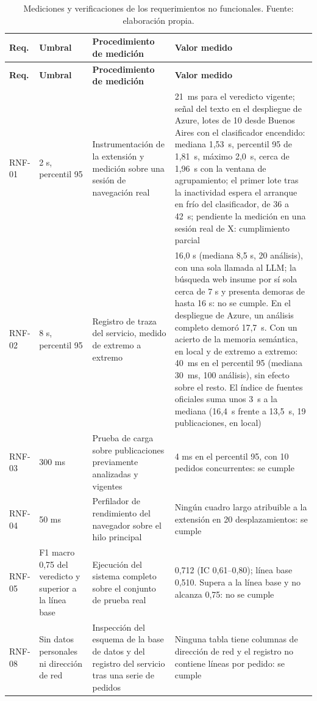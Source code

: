 \begin{footnotesize}
\begin{longtable}{@{}l p{3cm} p{4.6cm} p{5.1cm}@{}}
    \caption{Mediciones y verificaciones de los requerimientos no funcionales. Fuente: elaboración propia.}
    \label{tab:criterios-validacion} \\
    \hline
    \textbf{Req.} & \textbf{Umbral} & \textbf{Procedimiento de medición} & \textbf{Valor medido} \\
    \hline
    \endfirsthead
    \hline
    \textbf{Req.} & \textbf{Umbral} & \textbf{Procedimiento de medición} & \textbf{Valor medido} \\
    \hline
    \endhead
    RNF-01 & 2 s, percentil 95 & Instrumentación de la extensión y medición sobre una sesión de navegación real & 21~ms para el veredicto vigente; señal del texto en el despliegue de Azure, lotes de 10 desde Buenos Aires con el clasificador encendido: mediana 1,53~s, percentil 95 de 1,81~s, máximo 2,0~s, cerca de 1,96~s con la ventana de agrupamiento; el primer lote tras la inactividad espera el arranque en frío del clasificador, de 36 a 42~s; pendiente la medición en una sesión real de X: cumplimiento parcial \\
    RNF-02 & 8 s, percentil 95 & Registro de traza del servicio, medido de extremo a extremo & 16,0 s (mediana 8,5 s, 20 análisis), con una sola llamada al LLM; la búsqueda web insume por sí sola cerca de 7 s y presenta demoras de hasta 16 s: no se cumple. En el despliegue de Azure, un análisis completo demoró 17,7~s. Con un acierto de la memoria semántica, en local y de extremo a extremo: 40~ms en el percentil 95 (mediana 30~ms, 100 análisis), sin efecto sobre el resto. El índice de fuentes oficiales suma unos 3~s a la mediana (16,4~s frente a 13,5~s, 19 publicaciones, en local) \\
    RNF-03 & 300 ms & Prueba de carga sobre publicaciones previamente analizadas y vigentes & 4 ms en el percentil 95, con 10 pedidos concurrentes: se cumple \\
    RNF-04 & 50 ms & Perfilador de rendimiento del navegador sobre el hilo principal & Ningún cuadro largo atribuible a la extensión en 20 desplazamientos: se cumple \\
    RNF-05 & F1 macro 0,75 del veredicto y superior a la línea base & Ejecución del sistema completo sobre el conjunto de prueba real & 0,712 (IC 0,61--0,80); línea base 0,510. Supera a la línea base y no alcanza 0,75: no se cumple \\
    RNF-08 & Sin datos personales ni dirección de red & Inspección del esquema de la base de datos y del registro del servicio tras una serie de pedidos & Ninguna tabla tiene columnas de dirección de red y el registro no contiene líneas por pedido: se cumple \\

\end{longtable}
\end{footnotesize}
